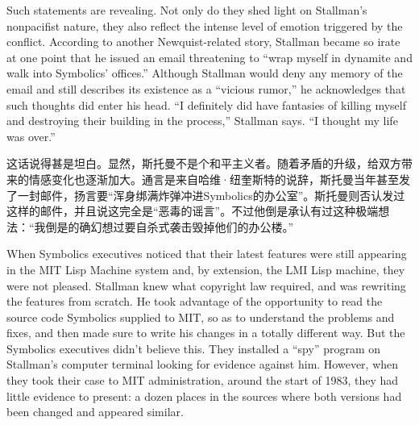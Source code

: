 \ifdefined\eng
Such statements are revealing. Not only do they shed light on Stallman's nonpacifist nature, they also reflect the intense level of emotion triggered by the conflict. According to another Newquist-related story, Stallman became so irate at one point that he issued an email threatening to ``wrap myself in dynamite and walk into Symbolics' offices.'' Although Stallman would deny any memory of the email and still describes its existence as a ``vicious rumor,'' he acknowledges that such thoughts did enter his head. ``I definitely did have fantasies of killing myself and destroying their building in the process,'' Stallman says. ``I thought my life was over.''
\fi

\ifdefined\chs
这话说得甚是坦白。显然，斯托曼不是个和平主义者。随着矛盾的升级，给双方带来的情感变化也逐渐加大。通言是来自哈维·纽奎斯特的说辞，斯托曼当年甚至发了一封邮件，扬言要``浑身绑满炸弹冲进Symbolics的办公室''。斯托曼则否认发过这样的邮件，并且说这完全是``恶毒的谣言''。不过他倒是承认有过这种极端想法：``我倒是的确幻想过要自杀式袭击毁掉他们的办公楼。''
\fi
\fi

\ifdefined\vtwo
\ifdefined\eng
When Symbolics executives noticed that their latest features were still appearing in the MIT Lisp Machine system and, by extension, the LMI Lisp machine, they were not pleased. Stallman knew what copyright law required, and was rewriting the features from scratch.  He took advantage of the opportunity to read the source code Symbolics supplied to MIT, so as to understand the problems and fixes, and then made sure to write his changes in a totally different way.  But the Symbolics executives didn't believe this.  They installed a ``spy'' program on Stallman's computer terminal looking for evidence against him.  However, when they took their case to MIT administration, around the start of 1983, they had little evidence to present: a dozen places in the sources where both versions had been changed and appeared similar.
\fi

